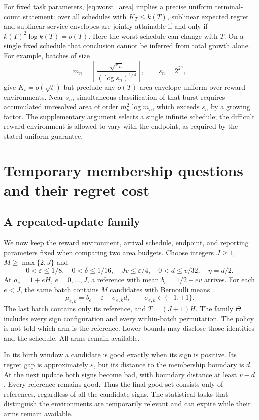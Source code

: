 \documentclass[11pt]{article}
\begin{document}
For fixed task parameters, \eqref{eq:worst_area} implies a precise uniform
terminal-count statement: over all schedules with $K_T\le k(T)$, sublinear
expected regret and sublinear service envelopes are jointly attainable if and
only if $k(T)^2\log k(T)=o(T)$. Here the worst schedule can change with $T$.
On a single fixed schedule that conclusion cannot be inferred from total
growth alone. For example, batches of size
\[
 m_n=\left\lfloor\frac{\sqrt{s_n}}{(\log s_n)^{1/4}}\right\rfloor,
 \qquad s_n=2^{2^n},
\]
give $K_t=o(\sqrt t)$ but preclude any $o(T)$ area envelope uniform over
reward environments. Near $s_n$, simultaneous classification of that burst
requires accumulated unresolved area of order $m_n^2\log m_n$, which exceeds
$s_n$ by a growing factor. The supplementary argument selects a single
infinite schedule; the difficult reward environment is allowed to vary with
the endpoint, as required by the stated uniform guarantee.
\section{Temporary membership questions and their regret cost}
\label{sec:tradeoff}

\subsection{A repeated-update family}

We now keep the reward environment, arrival schedule, endpoint, and reporting
parameters fixed when comparing two area budgets. Choose integers $J\ge1$,
$M\ge\max\{2,J\}$ and
\begin{equation}
 0<\varepsilon\le1/8,\quad 0<\delta\le1/16,\quad
 Jv\le\varepsilon/4,\quad 0<d\le v/32,\quad\eta=d/2.
 \label{eq:family_parameters}
\end{equation}
At $a_e=1+eH$, $e=0,\ldots,J$, a reference with mean $b_e=1/2+ev$
arrives. For each $e<J$, the same batch contains $M$ candidates with Bernoulli
means
\begin{equation}
 \mu_{e,k}=b_e-\varepsilon+\sigma_{e,k}d,
           \qquad \sigma_{e,k}\in\{-1,+1\}.
 \label{eq:family_means}
\end{equation}
The last batch contains only its reference, and $T=(J+1)H$. The family
$\Theta$ includes every sign configuration and every within-batch permutation.
The policy is not told which arm is the reference. Lower bounds may disclose
those identities and the schedule. All arms remain available.

In its birth window a candidate is good exactly when its sign is positive.
Its regret gap is approximately $\varepsilon$, but its distance to the
membership boundary is $d$. At the next update both signs become bad, with
boundary distance at least $v-d$. Every reference remains good. Thus the final
good set consists only of references, regardless of all the candidate signs.
The statistical tasks that distinguish the environments are temporarily
relevant and can expire while their arms remain available.
\end{document}
